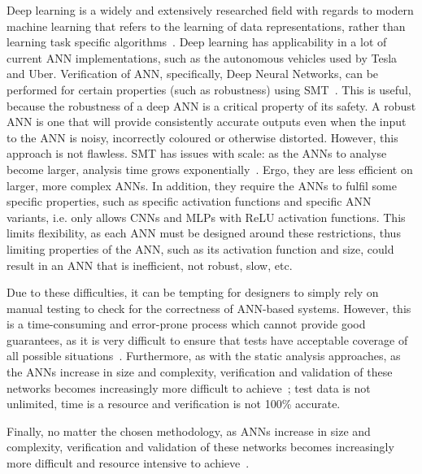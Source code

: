 Deep learning is a widely and extensively researched field with regards to modern machine learning that refers to the learning of data representations, rather than learning task specific algorithms~\cite{schmidhuber2015deep}.
Deep learning has applicability in a lot of current \ac{ANN} implementations, such as the autonomous vehicles used by Tesla and Uber.
Verification of \ac{ANN}, specifically, Deep Neural Networks, can be performed for certain properties (such as robustness) using \ac{SMT}~\cite{Gehr2018AI2SA,reluplex,DeepANNverify}.
This is useful, because the robustness of a deep \ac{ANN} is a critical property of its safety.
A robust \ac{ANN} is one that will provide consistently accurate outputs even when the input to the \ac{ANN} is noisy, incorrectly coloured or otherwise distorted. 
However, this approach is not flawless. 
\ac{SMT} has issues with scale: as the \acp{ANN} to analyse become larger, analysis time grows exponentially~\cite{Gehr2018AI2SA}.
Ergo, they are less efficient on larger, more complex \acp{ANN}.
In addition, they require the \acp{ANN} to fulfil some specific properties, such as specific activation functions and specific \ac{ANN} variants, i.e. \cite{Gehr2018AI2SA} only allows \acp{CNN} and \acp{MLP} with \ac{ReLU} activation functions.
This limits flexibility, as each \ac{ANN} must be designed around these restrictions, thus limiting properties of the \ac{ANN}, such as its activation function and size, could result in an \ac{ANN} that is inefficient, not robust, slow, etc.

Due to these difficulties, it can be tempting for designers to simply rely on manual testing to check for the correctness of \ac{ANN}-based systems. 
However, this is a time-consuming and error-prone process which cannot provide good guarantees, as it is very difficult to ensure that tests have acceptable coverage of all possible situations~\cite{ANN-test}.
Furthermore, as with the static analysis approaches, as the \acp{ANN} increase in size and complexity, verification and validation of these networks becomes increasingly more difficult to achieve~\cite{Gehr2018AI2SA}; test data is not unlimited, time is a resource and verification is not 100\% accurate.

Finally, no matter the chosen methodology, as \acp{ANN} increase in size and complexity, verification and validation of these networks becomes increasingly more difficult and resource intensive to achieve~\cite{Gehr2018AI2SA}.

